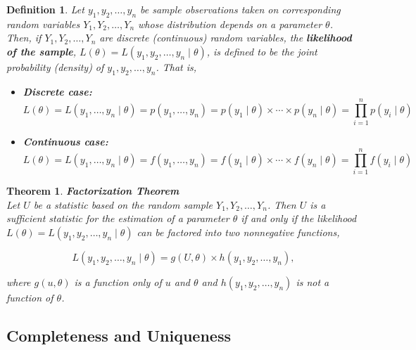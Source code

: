 \documentclass[a4paper,12pt]{article}
\theoremstyle{nonitalic}
\newtheorem{definition}{Definition}[subsection]
\newtheorem{theorem}{Theorem}[subsection]
\begin{document}
    \begin{definition}
        Let \(y_1, y_2, \ldots, y_n\) be sample observations taken on corresponding random variables \(Y_1, Y_2, \ldots, Y_n\) whose distribution depends on a parameter \(\theta\). Then, if \(Y_1, Y_2, \ldots, Y_n\) are discrete (continuous) random variables, the \textbf{likelihood of the sample}, \(L(\theta) = L(y_1, y_2, \ldots, y_n \mid \theta)\), is defined to be the joint probability (density) of \(y_1, y_2, \ldots, y_n\). That is,
        
        \begin{itemize}
            \item \textbf{Discrete case:}
            \[
            L(\theta) = L(y_1, \ldots, y_n \mid \theta) = p(y_1, \ldots, y_n) = p(y_1 \mid \theta) \times \cdots \times p(y_n \mid \theta) = \prod_{i=1}^{n} p(y_i \mid \theta)
            \]
        
            \item \textbf{Continuous case:}
            \[
            L(\theta) = L(y_1, \ldots, y_n \mid \theta) = f(y_1, \ldots, y_n) = f(y_1 \mid \theta) \times \cdots \times f(y_n \mid \theta) = \prod_{i=1}^{n} f(y_i \mid \theta)
            \]
        \end{itemize}
    \end{definition}

    \begin{theorem} \textbf{Factorization Theorem}\\
        Let \( U \) be a statistic based on the random sample \( Y_1, Y_2, \ldots, Y_n \). Then \( U \) is a sufficient statistic for the estimation of a parameter \(\theta\) if and only if the likelihood \( L(\theta) = L(y_1, y_2, \ldots, y_n \mid \theta) \) can be factored into two nonnegative functions,
        
        \[
        L(y_1, y_2, \ldots, y_n \mid \theta) = g(U, \theta) \times h(y_1, y_2, \ldots, y_n),
        \]
        
        where \( g(u, \theta) \) is a function only of \( u \) and \(\theta\) and \( h(y_1, y_2, \ldots, y_n) \) is not a function of \(\theta\).
    \end{theorem}

    \newpage

    \subsection{Completeness and Uniqueness}
\end{document}
